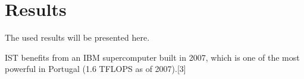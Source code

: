 \section{Results}
\label{sec:Results}


The used results will be presented here.

IST benefits from an IBM supercomputer built in 2007, which is one of the most powerful in Portugal (1.6 TFLOPS as of 2007).[3]


